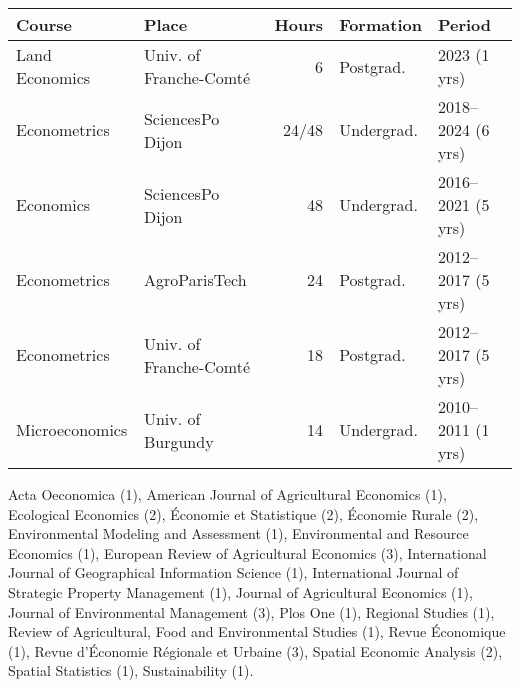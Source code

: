 \documentclass[11pt, a4paper]{./style}
\begin{document}
\label{sec:org9ce3bb1}

\begin{center}
\begin{tabular}{llrll}
\textbf{Course} & \textbf{Place} & \textbf{Hours} & \textbf{Formation} & \textbf{Period}\\[0pt]
\hline
Land Economics & Univ. of Franche-Comté & 6 & Postgrad. & 2023 (1 yrs)\\[0pt]
Econometrics & SciencesPo Dijon & 24/48 & Undergrad. & 2018--2024 (6 yrs)\\[0pt]
Economics & SciencesPo Dijon & 48 & Undergrad. & 2016--2021 (5 yrs)\\[0pt]
Econometrics & AgroParisTech & 24 & Postgrad. & 2012--2017 (5 yrs)\\[0pt]
Econometrics & Univ. of Franche-Comté & 18 & Postgrad. & 2012--2017 (5 yrs)\\[0pt]
Microeconomics & Univ. of Burgundy & 14 & Undergrad. & 2010--2011 (1 yrs)\\[0pt]
\hline
\end{tabular}
\end{center}

\label{sec:org0e03687}

\vspace{.5cm}

Acta Oeconomica (1), American Journal of Agricultural Economics
(1), Ecological Economics (2), Économie et Statistique (2),
Économie Rurale (2), Environmental Modeling and Assessment (1),
Environmental and Resource Economics (1), European Review of
Agricultural Economics (3), International Journal of Geographical
Information Science (1), International Journal of Strategic
Property Management (1), Journal of Agricultural Economics (1),
Journal of Environmental Management (3), Plos One (1), Regional
Studies (1), Review of Agricultural, Food and Environmental Studies
(1), Revue Économique (1), Revue d'Économie Régionale et Urbaine
(3), Spatial Economic Analysis (2), Spatial Statistics (1),
Sustainability (1).

\vspace{.5cm}

\label{sec:org53e9b2b}
\end{document}
